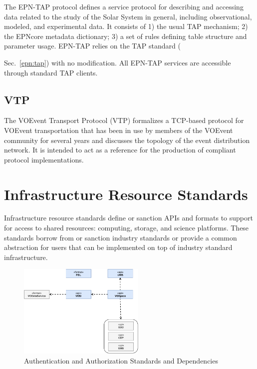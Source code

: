 \documentclass[11pt,letter]{ivoa}
\begin{document}
The EPN-TAP protocol  \citep{2022ivoa.spec.0822E} defines a service protocol for describing and accessing data related to the study of the Solar System in general, including observational, modeled, and experimental data. It consists of 1) the usual TAP mechanism; 2) the EPNcore metadata dictionary; 3) a set of rules defining table structure and parameter usage. EPN-TAP relies on the TAP  standard ({Sec.~\ref{epn:tap}) with no modification. All EPN-TAP services are accessible through standard TAP clients.


\subsection{VTP}

The VOEvent Transport Protocol (VTP) \citep{2017ivoa.spec.0320S} formalizes a TCP-based protocol for VOEvent transportation 
that has been in use by members of the VOEvent community for several years and discusses 
the topology of the event distribution network. It is intended to act as a reference for 
the production of compliant protocol implementations. 

\section{Infrastructure Resource Standards}
\label{gws}

Infrastructure resource standards define or sanction APIs and formats to support for access 
to shared resources: computing, storage, and science platforms. These standards borrow from
or sanction industry standards or provide a common abstraction for users that can be implemented 
on top of industry standard infrastructure.

\begin{figure}[ht]
\centering
\includegraphics[width=0.54\textwidth]{ivoa-arch-gws.pdf}
\caption{Authentication and Authorization Standards and Dependencies}
\label{fig:gwsdeps}
\end{figure}

}
\end{document}
